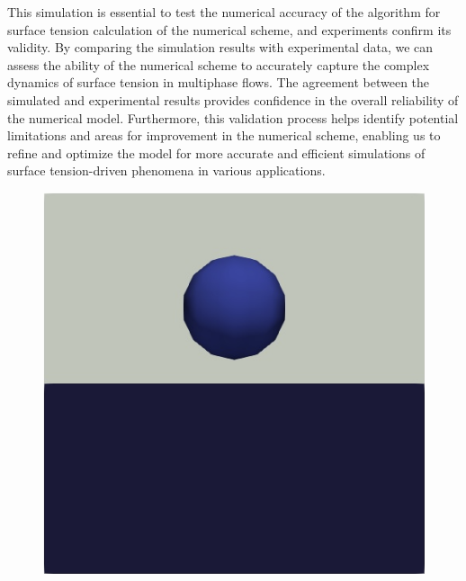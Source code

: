 This simulation is essential to test the numerical accuracy of the algorithm for surface tension calculation of the numerical scheme, and experiments confirm its validity. By comparing the simulation results with experimental data, we can assess the ability of the numerical scheme to accurately capture the complex dynamics of surface tension in multiphase flows. The agreement between the simulated and experimental results provides confidence in the overall reliability of the numerical model. Furthermore, this validation process helps identify potential limitations and areas for improvement in the numerical scheme, enabling us to refine and optimize the model for more accurate and efficient simulations of surface tension-driven phenomena in various applications.
\begin{figure}[H]
    \centering
    \begin{minipage}{.4\textwidth}
        \centering
        \includegraphics[width=\linewidth]{Images/chap4/water_sphere/sphere_in_water0.png}
    \end{minipage}%
    \hspace{0.05\textwidth}
    \begin{minipage}{.4\textwidth}
        \centering

\end{minipage}
\end{figure}
